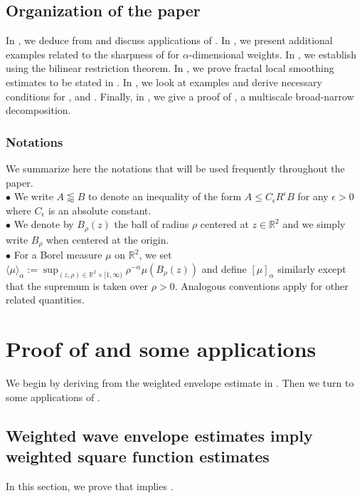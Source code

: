 \documentclass[11pt]{amsart}
\theoremstyle{definition}
\theoremstyle{remark}
\newcommand{\R}{\mathbb{R}}
\newcommand{\less}{\lessapprox}
\newcommand{\eps}{\epsilon}
\newcommand{\inn}[1]{\langle  #1 \rangle}
\begin{document}
\subsection*{Organization of the paper}
In , we deduce  from  and discuss applications of . 
In , we present additional examples related to the sharpness of  for $\alpha$-dimensional weights.
In , we establish  using the bilinear restriction theorem. 
In , we prove fractal local smoothing estimates to be stated in . 
In , we look at examples and derive necessary conditions for  ,  and .
Finally, in , we give a proof of , a multiscale broad-narrow decomposition.


\subsubsection*{Notations}
We summarize here the notations that will be used frequently throughout the paper.\\[3pt]
$\bullet$ We write $A \less B$ to denote an inequality of the form $A \leq C_{\eps} R^{\eps} B$ for any $\eps>0$ where $C_{\eps}$ is an absolute constant.\\[3pt]
$\bullet$ We denote by $B_\rho(z)$ the ball of radius $\rho$ centered at $z\in \R^2$ and we simply write $B_\rho$ when centered at the origin.\\[3pt]
$\bullet$ For a Borel measure $\mu$ on $\R^2$, we set $\displaystyle{\inn{\mu}_\alpha:=\sup_{(z,\rho)\in \R^2\times [1,\infty) } \rho^{-\alpha} \mu(B_\rho(z))}$ and define $[\mu]_\alpha$ similarly except that the supremum is taken over $\rho>0$. Analogous conventions apply for other related quantities.



\section{Proof of  and some applications}\label{sec:app}
We begin by deriving  from the weighted envelope estimate in . Then we turn to some applications of . 

\subsection{Weighted wave envelope estimates imply weighted square function estimates}
In this section, we prove that  implies .
\end{document}
